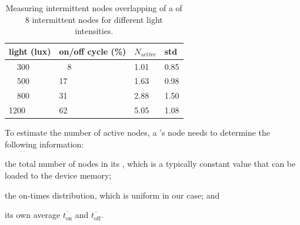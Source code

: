 \begin{table}
		\centering
		\caption{Measuring intermittent nodes overlapping of a \cis of 8 intermittent nodes for different light intensities.}
		\begin{tabular}{llll}
				\hline
				\textbf{light (lux)} &\textbf{on/off cycle (\%)}  & \textbf{$N_\text{active}$} & \textbf{std}   \\
				\hline
				\ \ 300	                 & \ \ 8  & 1.01 & 0.85   \\
				\ \ 500                  & 17 & 1.63 & 0.98   \\
				\ \ 800                  & 31 & 2.88 & 1.50   \\
				1200                 & 62 & 5.05 & 1.08   \\
				\hline
		\end{tabular}
		\label{tab:clusters}
\end{table}

To estimate the number of active nodes, a \cis's node needs to determine the following information:
\begin{enumerate*}[label=(\roman*)]
 \item the total number of nodes in its \cis, which is a typically constant value that can be loaded to the device memory; 
  \item the on-times distribution, which is uniform in our case; and
 \item its own average $\overline{t_\text{on}}$ and $\overline{t_\text{off}}$. 
\end{enumerate*}

